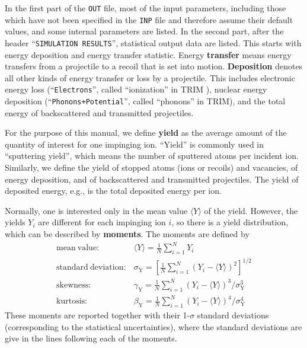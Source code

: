 In the first part of the \texttt{OUT} file, most of the input parameters,
including those which have not been specified in the \texttt{INP} file and
therefore assume their default values, and some internal parameters are listed.
In the second part, after the header ``\texttt{SIMULATION RESULTS}'',
statistical output data are listed. This starts with energy deposition and
energy transfer statistic. Energy \textbf{transfer} means energy transfers from
a projectile to a recoil that is set into motion. \textbf{Deposition} denotes
all other kinds of energy transfer or loss by a projectile. This includes
electronic energy loss (``\texttt{Electrons}'', called ``ionization'' in TRIM
\cite{SRIM}), nuclear energy deposition (``\texttt{Phonons+Potential}'', called
``phonons'' in TRIM), and the total energy of backscattered and transmitted
projectiles.

For the purpose of this manual, we define \textbf{yield} as the average amount
of the quantity of interest for one impinging ion. ``Yield'' is commonly used in
``sputtering yield'', which means the number of sputtered atoms per incident
ion. Similarly, we define the yield of stopped atoms (ions or recoils) and
vacancies, of energy deposition, and of backscattered and transmitted
projectiles. The yield of deposited energy, e.g., is the total deposited energy
per ion.

Normally, one is interested only in the mean value $\langle Y \rangle$ of the
yield. However, the yields $Y_i$ are different for each impinging ion $i$, so
there is a yield distribution, which can be described by \textbf{moments}. The
moments are defined by
%
\begin{eqnarray}
    \mathrm{mean\ value}: & 
        \langle Y \rangle = \frac{1}{N} \sum_{i=1}^N Y_i \label{eq:mom1} \\
    \mathrm{standard\ deviation}: & 
        \sigma_\mathrm{Y} = \left[ \frac{1}{N} \sum_{i=1}^N (Y_i-\langle Y \rangle)^2  
        \right] ^ {1/2} \label{eq:mom2} \\
    \mathrm{skewness}: &
        \gamma_\mathrm{Y} = \frac{1}{N} \sum_{i=1}^N (Y_i-\langle Y \rangle)^3 / 
        \sigma_\mathrm{Y}^3 \label{eq:mom3} \\
    \mathrm{kurtosis}: &
        \beta_\mathrm{Y} = \frac{1}{N} \sum_{i=1}^N (Y_i-\langle Y \rangle)^4 / 
        \sigma_\mathrm{Y}^4 \label{eq:mom4}
\end{eqnarray}
%
These moments are reported together with their 1-$\sigma$ standard
deviations (corresponding to the statistical uncertainties), where the standard
deviations are give in the lines following each of the moments.

